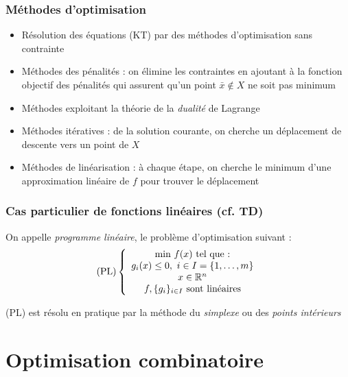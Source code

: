 \documentclass{beamer}
\newcommand{\R}{{\ensuremath\mathbb{R}}}
\begin{document}
\begin{frame}
  \frametitle{Méthodes d'optimisation}

  \begin{itemize}
  \item Résolution des équations (KT) par des méthodes d'optimisation sans contrainte
  \item Méthodes des pénalités : on élimine les contraintes en ajoutant à la fonction objectif des pénalités qui assurent
    qu'un point $\bar{x} \notin X$ ne soit pas minimum   
  \item Méthodes exploitant la théorie de la \emph{dualité} de Lagrange
  \item Méthodes itératives : de la solution courante, on cherche un déplacement de descente vers un point de $X$
  \item Méthodes de linéarisation : à chaque étape, on cherche le minimum d'une approximation linéaire de $f$ pour trouver le
    déplacement 
  \end{itemize}
  
\end{frame}

\begin{frame}
  \frametitle{Cas particulier de fonctions linéaires (cf. TD)}

  On appelle \emph{programme linéaire}, le problème d'optimisation
  suivant : 
  \[
  \text{(PL)} \left\{
  \begin{array}{c}
    \text{min} \ f(x) \ \text{tel que :} \\
    g_i(x) \leq 0, \ i \in I = \{1, \dots, m\} \\
    x \in \R^n \\
    f, \{g_i\}_{i \in I} \ \text{sont linéaires} \\
  \end{array}
  \right.
  \]

  (PL) est résolu en pratique par la méthode du \emph{simplexe}
ou des \emph{points intérieurs}
\end{frame}


\section{Optimisation combinatoire}

\end{document}
